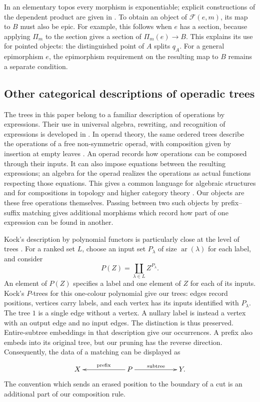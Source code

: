 \documentclass[11pt,a4paper]{article}
\theoremstyle{plain}
\theoremstyle{definition}
\theoremstyle{remark}
\newcommand{\Fill}{\mathcal F}
\begin{document}
In an elementary topos every morphism is exponentiable;
explicit constructions of the dependent product are given
in \cite{CaramelloZanfa}. To obtain an object of $\Fill(e,m)$,
its map to $B$ must also be epic. For example, this follows
when $e$ has a section, because applying $\Pi_m$ to the section
gives a section of $\Pi_m(e)\to B$. This explains its use for
pointed objects: the distinguished point of $A$ splits
$q_A$. For a general epimorphism $e$, the epimorphism requirement
on the resulting map to $B$ remains a separate condition.

\subsection{Other categorical descriptions of operadic trees}
\label{concl:operadic-literature}

The trees in this paper belong to a familiar description of
operations by expressions. Their use in universal algebra,
rewriting, and recognition of expressions is developed in
\cite{BurrisSankappanavar,BaaderNipkow,TATA}. In operad theory,
the same ordered trees describe the operations of a free
non-symmetric operad, with composition given by insertion
at empty leaves \cite[Section~2.3]{Leinster}. An operad records
how operations can be composed through their inputs. It can
also impose equations between the resulting expressions;
an algebra for the operad realizes the operations as actual
functions respecting those equations. This gives a common
language for algebraic structures and for compositions in
topology and higher category theory
\cite[Introduction and Section~2.2]{Leinster}.
Our objects are these free operations themselves. Passing
between two such objects by prefix--suffix matching gives
additional morphisms which record how part of one expression
can be found in another.

Kock's description by polynomial functors is particularly
close at the level of trees \cite{KockTrees}. For a ranked
set $L$, choose an input set $P_\lambda$ of size
$\operatorname{ar}(\lambda)$ for each label, and consider
\[
P(Z)=\coprod_{\lambda\in L}Z^{P_\lambda}.
\]
An element of $P(Z)$ specifies a label and one element of
$Z$ for each of its inputs. Kock's $P$-trees for this
one-colour polynomial give our trees: edges record positions,
vertices carry labels, and each vertex has its inputs
identified with $P_\lambda$. The tree $1$ is a single edge
without a vertex. A nullary label is instead a vertex with
an output edge and no input edges. The distinction is thus
preserved. Entire-subtree embeddings in that description
give our occurrences. A prefix also embeds into its original
tree, but our pruning has the reverse direction. Consequently,
the data of a matching can be displayed as
\[
\xymatrix@C=6em{
X&P\ar[l]_{\text{prefix}}
\ar[r]^{\text{subtree}}&Y.
}
\]
The convention which sends an erased position to the boundary
of a cut is an additional part of our composition rule.
\end{document}

